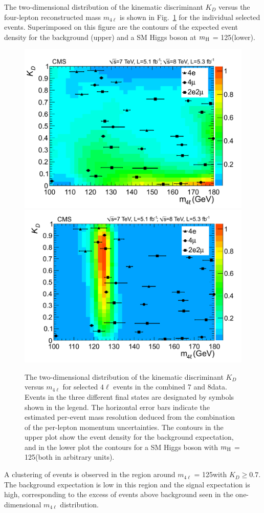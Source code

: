 \documentclass[11pt,twoside,a4paper,cmspaper,final,collab]{cms-tdr}
\begin{document}
The two-dimensional distribution of the kinematic discriminant $K_{D}$ versus the four-lepton reconstructed mass
$m_{4\ell}$ is shown in Fig.~\ref{fig:Mass4lKD} for the individual selected events.
Superimposed on this figure are the contours of the
expected event density for the background (upper) and a
SM Higgs boson at $m_{\mathrm{H}}$ = 125\GeV (lower).
\begin{figure}[htbp]
   \begin{center}
     \includegraphics[width=0.7\linewidth]{figures/HZZ_candidates_mela_background}
     \includegraphics[width=0.7\linewidth]{figures/HZZ_candidates_mela_signal}
    \caption{
    The two-dimensional distribution of  the kinematic
    discriminant $K_{D}$ versus $m_{4\ell}$ for selected $4\ell$ events in the combined 7 and 8\TeV data.
    Events in the three different final states are designated by symbols shown in the legend.
    The horizontal error bars indicate the estimated per-event mass resolution deduced from the
    combination of the per-lepton momentum uncertainties.
    The contours in the upper plot show the event density for the background expectation,
    and in the lower plot the contours for a
    SM Higgs boson with $m_{\mathrm{H}}$ = 125\GeV (both in arbitrary units). }
\label{fig:Mass4lKD}
   \end{center}
\end{figure}
A clustering of events is observed in the region around $m_{4\ell}$ = 125\GeV with $K_{D} \ge 0.7$.
The background expectation is low in this region and
the signal expectation is high, corresponding to the excess of events above background seen in the
one-dimensional $m_{4\ell}$ distribution.
\end{document}
